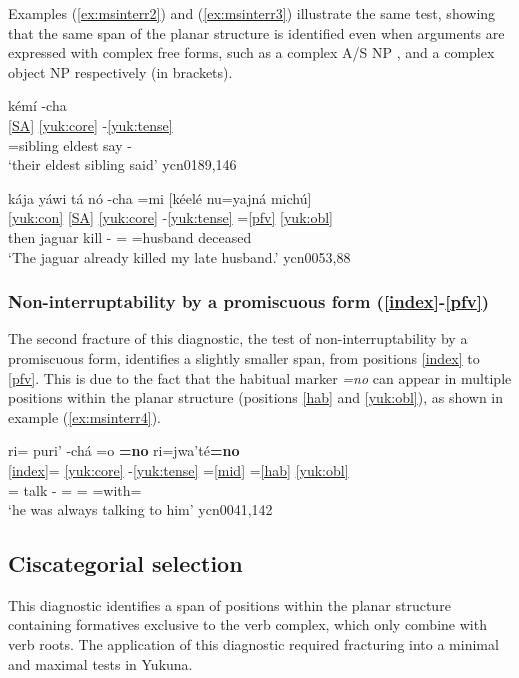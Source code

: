 \documentclass[output=paper]{langscibook}
\begin{document}
Examples (\ref{ex:msinterr2}) and (\ref{ex:msinterr3}) illustrate the same test, showing that the same span of the planar structure is identified even when arguments are expressed with complex free forms, such as a complex A/S NP , and a complex object NP respectively (in brackets).

\ea \label{ex:msinterr2}
    \glll [kéelé na=e'wé phe'jí] kémí -cha  \\
         \ref{SA} {}   {}      \ref{yuk:core} -\ref{yuk:tense} \\
          \Dem{} \Tpl{}=sibling eldest say -\Pst{} \\
    \glt `their eldest sibling said' \hfill ycn0189,146
 \z

\ea \label{ex:msinterr3}
    \glll kája yáwi tá nó -cha =mi [kéelé nu=yajná michú]\\
         \ref{yuk:con} \ref{SA} {}  \ref{yuk:core} -\ref{yuk:tense} =\ref{pfv} \ref{yuk:obl} {} {} \\
          then jaguar \Emph{} kill -\Pst{} =\Pfv{} \Dem{} \Fsg{}=husband deceased \\
    \glt `The jaguar already killed my late husband.' \hfill ycn0053,88
 \z

\subsubsection{Non-interruptability by a promiscuous form (\ref{index}-\ref{pfv})}
The second fracture of this diagnostic, the test of non-interruptability by a promiscuous form, identifies a slightly smaller span, from positions \ref{index} to \ref{pfv}. This is due to the fact that the habitual marker \textit{=no} can appear in multiple positions within the planar structure (positions \ref{hab} and \ref{yuk:obl}), as shown in example (\ref{ex:msinterr4}).

\ea \label{ex:msinterr4}
    \glll ri= puri' -chá =o \textbf{=no} ri=jwa'té\textbf{=no}   \\
         \ref{index}= \ref{yuk:core} -\ref{yuk:tense} =\ref{mid} =\ref{hab} \ref{yuk:obl}  \\
          \Tsg{}= talk -\Pst{} =\Mid{} =\Hab{} \Tsg{}=with=\Hab{} \\
    \glt `he was always talking to him' \hfill ycn0041,142
 \z
 
\subsection{Ciscategorial selection}
\label{ss:ciscat}
This diagnostic identifies a span of positions within the planar structure containing formatives exclusive to the verb complex, which only combine with verb roots. The application of this diagnostic required fracturing into a minimal and maximal tests in Yukuna.
\end{document}
